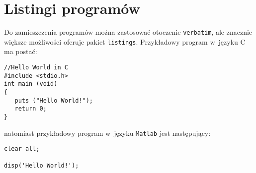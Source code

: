 \chapter{Listingi programów}
Do zamieszczenia programów można zastosować otoczenie \verb+verbatim+, ale znacznie większe możliwości oferuje pakiet \verb+listings+. Przykładowy program w~języku C ma postać:
\begin{lstlisting}[style=customc,frame=single] 
//Hello World in C
#include <stdio.h>
int main (void)
{
   puts ("Hello World!");
   return 0;
}
\end{lstlisting}
natomiast przykładowy program w~języku \verb+Matlab+ jest następujący:
\begin{lstlisting}[style=Matlab-editor]
%Hello World in Matlab
clear all;

disp('Hello World!');
\end{lstlisting} 






